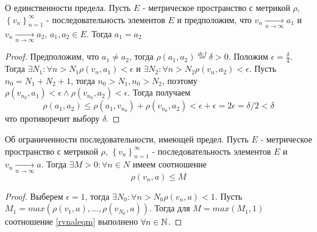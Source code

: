 \documentclass[main]{subfiles}
\begin{document}
\begin{theorem}
    О единственности предела. Пусть $E$ - метрическое пространство с метрикой
    $\rho$, $\left\{v_n\right\}_{n = 1}^{\infty}$ - последовательность 
    элементов $E$ и предположим, что $v_n \underset{n\to\infty}{\to} a_1$ и 
    $v_n \underset{n\to\infty}{\to} a_2$, $a_1, a_2 \in E$. Тогда $a_1 = a_2$
\end{theorem}
\begin{proof}
    Предположим, что $a_1 \neq a_2$, тогда $\rho(a_1, a_2) \overset{def}{=} 
    \delta > 0$. Положим $\epsilon = \frac{\delta}{4}$. Тогда
    $\exists N_1 : \forall n > N_1 \rho(v_n, a_1) < \epsilon$ и
    $\exists N_2 : \forall n > N_2 \rho(v_n, a_2) < \epsilon$.
    Пусть $n_0 = N_1 + N_2 + 1$, тогда $n_0 > N_1, n_0 > N_2$, поэтому 
    $\rho(v_{n_0}, a_1) < \epsilon \wedge \rho(v_{n_0}, a_2) < \epsilon$.
    Тогда получаем
    \begin{equation*}
        \rho(a_1, a_2) \leq \rho(a_1, v_{n_0}) + \rho(v_{n_0}, a_2) < 
        \epsilon + \epsilon = 2\epsilon = \delta / 2 < \delta
    \end{equation*}
    что противоречит выбору $\delta$.
\end{proof}

\begin{theorem}
    Об ограниченности последовательности, имеющей предел.
    Пусть $E$ - метрическое пространство с метрикой
    $\rho$, $\left\{v_n\right\}_{n = 1}^{\infty}$ - последовательность 
    элементов $E$ и $v_n \underset{n\to\infty}{\to} a$. Тогда 
    $\exists M > 0 : \forall n \in N$ имеем соотношение
    \begin{equation}\label{rvnaleqm}
        \rho(v_n, a) \leq M
    \end{equation}
\end{theorem}
\begin{proof}
    Выберем $\epsilon = 1$, тогда $\exists N_0 : \forall n > N_0   
    \rho(v_n, a) < 1$. Пусть $M_1 = max(\rho(v_1, a), \ldots, \rho(v_{N_0}, a))$.
    Тогда для $M = max(M_1, 1)$ соотношение \ref{rvnaleqm} выполнено 
    $\forall n \in \mathbb{N}$. 
\end{proof}
\end{document}
